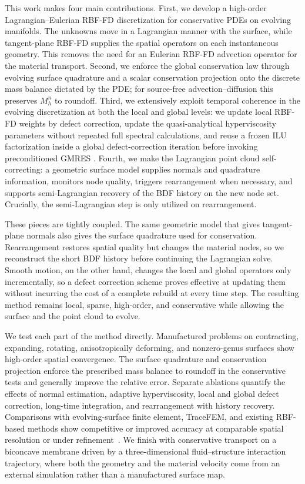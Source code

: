 \documentclass[a4paper,fleqn]{cas-sc}
\begin{document}
This work makes four main contributions. First, we develop a high-order Lagrangian--Eulerian RBF-FD discretization for conservative PDEs on evolving manifolds. The unknowns move in a Lagrangian manner with the surface, while tangent-plane RBF-FD supplies the spatial operators on each instantaneous geometry. This removes the need for an Eulerian RBF-FD advection operator for the material transport. Second, we enforce the global conservation law through evolving surface quadrature and a scalar conservation projection onto the discrete mass balance dictated by the PDE; for source-free advection--diffusion this preserves $M_h^n$ to roundoff. Third, we extensively exploit temporal coherence in the evolving discretization at both the local and global levels: we update local RBF-FD weights by defect correction, update the quasi-analytical hyperviscosity parameters without repeated full spectral calculations, and reuse a frozen ILU factorization inside a global defect-correction iteration before invoking preconditioned GMRES
\cite{shankar_hyperviscosity-based_2018,ShankarWrightNarayan2020}. Fourth, we make the Lagrangian point cloud self-correcting: a geometric surface model supplies normals and quadrature information, monitors node quality, triggers rearrangement when necessary, and supports semi-Lagrangian recovery of the BDF history on the new node set. Crucially, the semi-Lagrangian step is only utilized on rearrangement.

These pieces are tightly coupled. The same geometric model that gives tangent-plane normals also gives the surface quadrature used for conservation. Rearrangement restores spatial quality but changes the material nodes, so we reconstruct the short BDF history before continuing the Lagrangian solve. Smooth motion, on the other hand, changes the local and global operators only incrementally, so a defect correction scheme proves effective at updating them without incurring the cost of a complete rebuild at every time step. The resulting method remains local, sparse, high-order, and conservative while allowing the surface and the point cloud to evolve.

We test each part of the method directly. Manufactured problems on contracting, expanding, rotating, anisotropically deforming, and nonzero-genus surfaces show high-order spatial convergence. The surface quadrature and conservation projection enforce the prescribed mass balance to roundoff in the conservative tests and generally improve the relative error. Separate ablations quantify the effects of normal estimation, adaptive hyperviscosity, local and global defect correction, long-time integration, and rearrangement with history recovery. Comparisons with evolving-surface finite element, TraceFEM, and existing RBF-based methods show competitive or improved accuracy at comparable spatial resolution or under refinement~\cite{DziukElliott2007EvolvingSurfaces,OlshanskiiXu2017TraceFEM,PetrasLingPiretRuuth2019LSRBFCPM,ChenLing2020KernelHeatTransport}.
We finish with conservative transport on a biconcave membrane driven by a three-dimensional fluid--structure interaction trajectory, where both the geometry and the material velocity come from an external simulation rather than a manufactured surface map.
\end{document}
